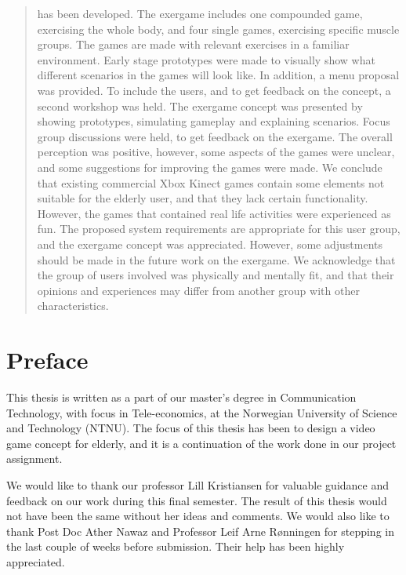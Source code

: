 \documentclass[b5paper,twoside,openright,11pt]{report}
\begin{document}
\begin{abstract}
has been developed. The exergame includes one compounded game, exercising the whole body, and four single games, exercising specific muscle groups. The games are made with relevant exercises in a familiar environment. Early stage prototypes were made to visually show what different scenarios in the games will look like. In addition, a menu proposal was provided. To include the users, and to get feedback on the concept, a second workshop was held. The exergame concept was presented by showing prototypes, simulating gameplay and explaining scenarios. Focus group discussions were held, to get feedback on the exergame. The overall perception was positive, however, some aspects of the games were unclear, and some suggestions for improving the games were made. We conclude that existing commercial Xbox Kinect games contain some elements not suitable for the elderly user, and that they lack certain functionality. However, the games that contained real life activities were experienced as fun. The proposed system requirements are appropriate for this user group, and the exergame concept was appreciated. However, some adjustments should be made in the future work on the exergame. We acknowledge that the group of users involved was physically and mentally fit, and that their opinions and experiences may differ from another group with other characteristics.


\end{abstract}
\cleardoublepage
\chapter*{Preface}
This thesis is written as a part of our master's degree in Communication Technology, with focus in Tele-economics, at the Norwegian University of Science and Technology (NTNU). The focus of this thesis has been to design a video game concept for elderly, and it is a continuation of the work done in our project assignment. 

We would like to thank our professor Lill Kristiansen for valuable guidance and feedback on our work during this final semester. The result of this thesis would not have been the same without her ideas and comments. We would also like to thank Post Doc Ather Nawaz and Professor Leif Arne Rønningen for stepping in the last couple of weeks before submission. Their help has been highly appreciated.  
\end{document}
